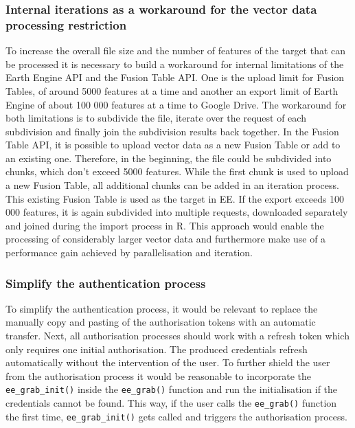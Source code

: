\subsubsection{Internal iterations as a workaround for the vector data processing restriction}

To increase the overall file size and the number of features of the target that can be processed it is necessary to build a workaround for internal limitations of the Earth Engine API and the Fusion Table API. One is the upload limit for Fusion Tables, of around 5000 features at a time and another an export limit of Earth Engine of about 100 000 features at a time to Google Drive. The workaround for both limitations is to subdivide the file, iterate over the request of each subdivision and finally join the subdivision results back together. In the Fusion Table API, it is possible to upload vector data as a new Fusion Table or add to an existing one. Therefore, in the beginning, the file could be subdivided into chunks, which don't exceed 5000 features. While the first chunk is used to upload a new Fusion Table, all additional chunks can be added in an iteration process. This existing Fusion Table is used as the target in EE. If the export exceeds 100 000 features, it is again subdivided into multiple requests, downloaded separately and joined during the import process in R. This approach would enable the processing of considerably larger vector data and furthermore make use of a performance gain achieved by parallelisation and iteration. 

\subsubsection{Simplify the authentication process}

To simplify the authentication process, it would be relevant to replace the manually copy and pasting of the authorisation tokens with an automatic transfer. Next, all authorisation processes should work with a refresh token which only requires one initial authorisation. The produced credentials refresh automatically without the intervention of the user. To further shield the user from the authorisation process it would be reasonable to incorporate the \texttt{ee\_grab\_init()} inside the \texttt{ee\_grab()} function and run the initialisation if the credentials cannot be found. This way, if the user calls the \texttt{ee\_grab()} function the first time, \texttt{ee\_grab\_init()} gets called and triggers the authorisation process. 

